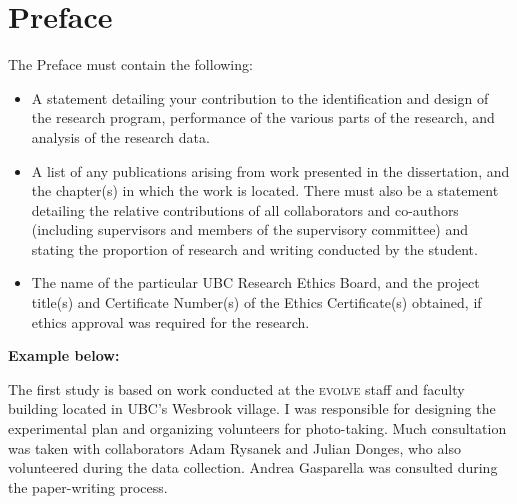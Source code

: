 \chapter{Preface}
The Preface must contain the following:
\begin{itemize}
    \item A statement detailing your contribution to the identification and
          design of the research program, performance of the various parts of
          the research, and analysis of the research data.
    \item A list of any publications arising from work presented in the
          dissertation, and the chapter(s) in which the work is located. There
          must also be a statement detailing the relative contributions of all
          collaborators and co-authors (including supervisors and members of
          the supervisory committee) and stating the proportion of research and
          writing conducted by the student.
    \item The name of the particular UBC Research Ethics Board, and the project
          title(s) and Certificate Number(s) of the Ethics Certificate(s)
          obtained, if ethics approval was required for the research.
\end{itemize}

\textbf{Example below:}

The first study is based on work conducted at the \textsc{evolve} staff and
faculty building located in UBC's Wesbrook village. I was responsible for
designing the experimental plan and organizing volunteers for photo-taking.
Much consultation was taken with collaborators Adam Rysanek and Julian Donges,
who also volunteered during the data collection. Andrea Gasparella was
consulted during the paper-writing process.

